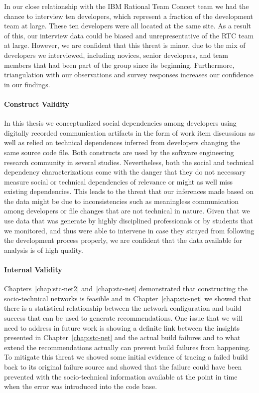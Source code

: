 In our close relationship with the IBM Rational Team Concert team we had the chance to interview ten developers, which represent a fraction of the development team at large. These ten developers were all located at the same site. As a result of this, our interview data could be biased and unrepresentative of the RTC team at large.
However, we are confident that this threat is minor, due to the mix of developers we interviewed, including novices, senior developers, and team members that had been part of the group since its beginning.
Furthermore, triangulation with our observations and survey responses increases our confidence in our findings.

\paragraph{Construct Validity}
In this thesis we conceptualized social dependencies among developers using digitally recorded communication artifacts in the form of work item discussions as well as relied on technical dependences inferred from developers changing the same source code file.
Both constructs are used by the software engineering research community in several studies.
Nevertheless, both the social and technical dependency characterizations come with the danger that they do not necessary measure social or technical dependencies of relevance or might as well miss existing dependencies.
This leads to the threat that our inferences made based on the data might be due to inconsistencies such as meaningless communication among developers or file changes that are not technical in nature.
Given that we use data that was generate by highly disciplined professionals or by students that we monitored, and thus were able to intervene in case they strayed from following the development process properly, we are confident that the data available for analysis is of high quality.

\paragraph{Internal Validity}
Chapters~\ref{chap:stc-net2} and~\ref{chap:stc-net} demonstrated that constructing the socio-technical networks is feasible and in Chapter~\ref{chap:stc-net} we showed that there is a statistical relationship between the network configuration and build success that can be used to generate recommendations.
One issue that we will need to address in future work is showing a definite link between the insights presented in Chapter~\ref{chap:stc-net} and the actual build failures and to what extend the recommendations actually can prevent build failures from happening. 
To mitigate this threat we showed some initial evidence of tracing a failed build back to its original failure source and showed that the failure could have been prevented with the socio-technical information available at the point in time when the error was introduced into the code base.

